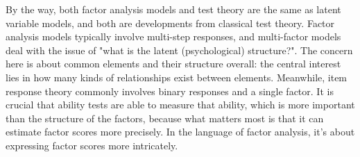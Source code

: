 \documentclass{ltjsbook}
\begin{document}
By the way, both factor analysis models and test theory are the same as latent variable models, and both are developments from classical test theory.
Factor analysis models typically involve multi-step responses, and multi-factor models deal with the issue of "what is the latent (psychological) structure?". The concern here is about common elements and their structure overall: the central interest lies in how many kinds of relationships exist between elements.
Meanwhile, item response theory commonly involves binary responses and a single factor. It is crucial that ability tests are able to measure that ability, which is more important than the structure of the factors, because what matters most is that it can estimate factor scores more precisely. In the language of factor analysis, it's about expressing factor scores more intricately.
\end{document}
